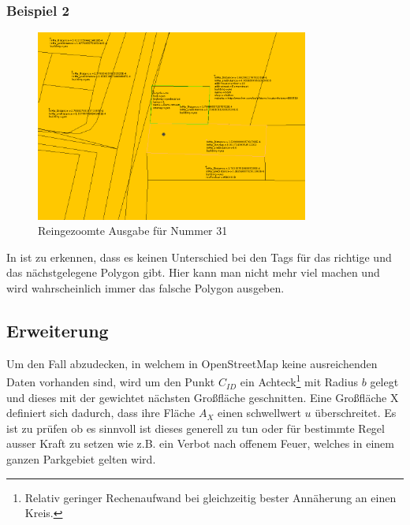 \subsubsection{Beispiel 2}
\begin{figure}
 \centering
 \includegraphics[width=0.8\textwidth]{DataFailZoom.png}
 \caption{Reingezoomte Ausgabe für Nummer 31}
 \label{fig:DataFailZoom}
\end{figure}
In  ist zu erkennen, dass es keinen Unterschied bei den Tags für das richtige und das nächstgelegene Polygon gibt.
Hier kann man nicht mehr viel machen und wird wahrscheinlich immer das falsche Polygon ausgeben.


\subsection{Erweiterung}
Um den Fall abzudecken, in welchem in OpenStreetMap keine ausreichenden Daten vorhanden sind, wird um den Punkt $C_{ID}$ ein
Achteck\footnote{Relativ geringer Rechenaufwand bei gleichzeitig bester Annäherung an einen Kreis.} mit Radius $b$ gelegt
und dieses mit der gewichtet nächsten Großfläche geschnitten.
Eine Großfläche X definiert sich dadurch, dass ihre Fläche $A_X$ einen schwellwert $u$ überschreitet.
Es ist zu prüfen ob es sinnvoll ist dieses generell zu tun oder für bestimmte Regel ausser Kraft zu setzen wie
z.B. ein Verbot nach offenem Feuer, welches in einem ganzen Parkgebiet gelten wird.
